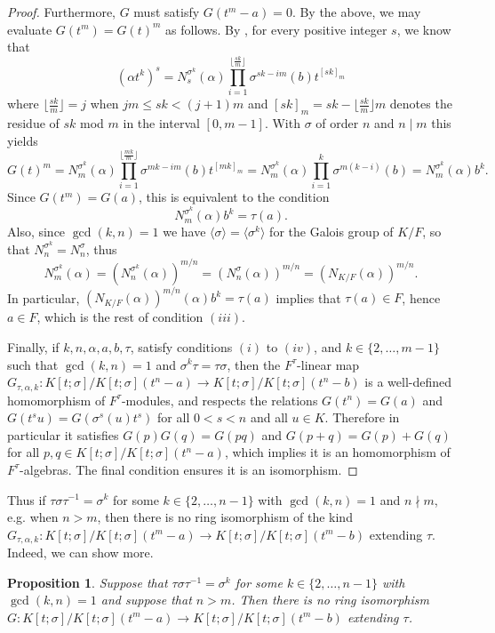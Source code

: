 \documentclass{amsart}
\theoremstyle{plain}
\newtheorem{proposition}[theorem]{Proposition}
\theoremstyle{definition}
\numberwithin{equation}{section}
\numberwithin{figure}{section}
\begin{document}
\begin{proof}
 Furthermore, $G$ must satisfy $G(t^{m}-a)=0$.  By the above, we may evaluate $G(t^{m})=G(t)^{m}$ as follows.
By \cite[Theorem 3.3]{NevPum2025}, for every positive integer $s$, we know that
\begin{equation}\label{G(t)^s}
(\alpha t^k)^s = N_{s}^{\sigma^k}(\alpha)\prod_{i=1}^{\lfloor \frac{sk}{{m}}\rfloor} \sigma^{sk-i{m}}(b)t^{[sk]_{m}}
\end{equation}
where $\lfloor \frac{sk}{m}\rfloor=j$ when $j{m}\leq sk<(j+1){m}$ and $[sk]_{m} = sk-\lfloor \frac{sk}{m}\rfloor m$ denotes the residue of $sk$ mod $m$ in the interval $[0,m-1]$. With  $\sigma$ of order $n$ and $n\mid m$ this yields
$$
G(t)^{m} = N_{m}^{\sigma^k}(\alpha) \prod_{i=1}^{\lfloor \frac{mk}{{m}}\rfloor} \sigma^{mk-i{m}}(b)t^{[mk]_{m}}=N_{m}^{\sigma^k}(\alpha) \prod_{i=1}^{k}\sigma^{m(k-i)}(b)=N_{m}^{\sigma^k}(\alpha) b^k.
$$
Since $G(t^{m})=G(a)$, this is equivalent to the condition
$$
N_{m}^{\sigma^k}(\alpha) b^k=\tau(a).
$$
Also, since $\gcd(k,n)=1$ we have $\langle \sigma\rangle=\langle \sigma^k\rangle $ for the Galois group of $K/F$, so that $N_{n}^{\sigma^k}=N_{n}^{\sigma}$, thus
$$
N_{m}^{\sigma^k}(\alpha) = (N_{n}^{\sigma^k}(\alpha))^{m/n} = (N^\sigma_{n}(\alpha))^{m/n}  = (N_{K/F}(\alpha))^{m/n}.
$$
In particular, $(N_{K/F}(\alpha))^{m/n}(\alpha) b^k=\tau(a)$ implies that $\tau(a)\in F$, hence $a\in F$, which is the rest of condition $(iii)$.


Finally, if $k,n,\alpha,a,b,\tau$,   satisfy conditions $(i)$ to $(iv)$, and $k\in \{2,\dots, m-1 \}$ such that $\gcd (k, n)=1$ and $\sigma^k\tau = \tau\sigma$, then the $F^\tau$-linear map $G_{\tau,\alpha,k}:K[t;\sigma]/K[t;\sigma](t^n-a)\to K[t;\sigma]/K[t;\sigma](t^n-b)$ is a well-defined homomorphism of $F^\tau$-modules, and respects the relations $G(t^{n})=G(a)$ and $G(t^su)=G(\sigma^s(u)t^s)$ for all $0<s<n$ and all $u\in K$.  Therefore in particular it satisfies $G(p)G(q)=G(pq)$ and $G(p+q)=G(p)+G(q)$ for all $p,q\in K[t;\sigma]/K[t;\sigma](t^n-a)$, which implies it is an homomorphism of $F^\tau$-algebras.  The final condition ensures it is an isomorphism.
\end{proof}


Thus if $\tau \sigma\tau^{-1}=\sigma^k$ for some $k\in \{2,\dots, n-1 \}$ with $\gcd (k, n)=1$ and  $n\nmid m$, e.g. when $n> m$,
   then there is no ring isomorphism of the kind
    $G_{\tau,\alpha,k}:K[t;\sigma]/K[t;\sigma](t^m-a)\to K[t;\sigma]/K[t;\sigma](t^m-b)$ extending $\tau$. Indeed, we can show more.

 \begin{proposition}\label{prop:newconditiononk}
   Suppose that $\tau \sigma\tau^{-1}=\sigma^k$ for some $k\in \{2,\dots, n-1 \}$ with $\gcd (k, n)=1$ and suppose that $n> m$.
   Then there is no ring isomorphism
    $G:K[t;\sigma]/K[t;\sigma](t^m-a)\to K[t;\sigma]/K[t;\sigma](t^m-b)$ extending $\tau$.
 \end{proposition}
\end{document}
